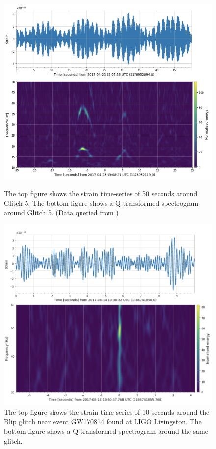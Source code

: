 \documentclass[preprint,
letterpaper,
 amsmath,amssymb,
 aps,
]{revtex4-2}
\begin{document}
 \begin{figure}[!tbp]
  \centering
  \begin{minipage}[b]{0.48\textwidth}
\includegraphics[width=\textwidth]{whistle graphics.png}
\caption{The top figure shows the strain time-series of 50 seconds around Glitch 5. The bottom figure shows a Q-transformed spectrogram around Glitch 5. (Data queried from \cite{collaboration2019open})}
  \end{minipage}
  \hfill
  \begin{minipage}[b]{0.48\textwidth}
\includegraphics[width=\textwidth]{blipppppp.png}
\caption{The top figure shows the strain time-series of 10 seconds around the Blip glitch near event GW170814 found at LIGO Livingston. The bottom figure shows a Q-transformed spectrogram around the same glitch. \cite{collaboration2019open}}
  \end{minipage}
\end{figure}
\end{document}
